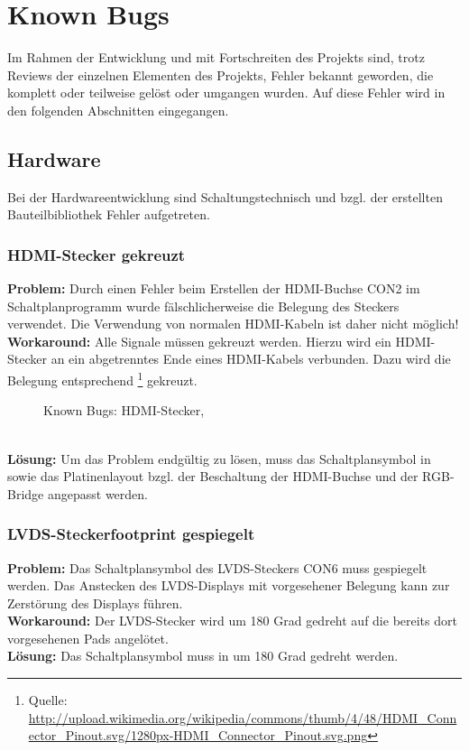 \section{Known Bugs}
Im Rahmen der Entwicklung und mit Fortschreiten des Projekts sind, trotz Reviews der einzelnen Elementen des Projekts, Fehler bekannt geworden, die komplett oder teilweise gelöst oder umgangen wurden. Auf diese Fehler wird in den folgenden Abschnitten eingegangen.
\subsection{Hardware}
Bei der Hardwareentwicklung sind Schaltungstechnisch und bzgl. der erstellten Bauteilbibliothek Fehler aufgetreten. 
\subsubsection{HDMI-Stecker gekreuzt}
\textbf{Problem:} Durch einen Fehler beim Erstellen der HDMI-Buchse CON2 im Schaltplanprogramm  wurde fälschlicherweise die Belegung des Steckers verwendet. Die Verwendung von normalen HDMI-Kabeln ist daher nicht möglich!\\
\textbf{Workaround:} Alle Signale müssen gekreuzt werden. Hierzu wird ein HDMI-Stecker an ein abgetrenntes Ende eines HDMI-Kabels verbunden. Dazu wird die Belegung entsprechend \footnote{Quelle: \url{http://upload.wikimedia.org/wikipedia/commons/thumb/4/48/HDMI_Connector_Pinout.svg/1280px-HDMI_Connector_Pinout.svg.png}} gekreuzt.
\begin{figure}[htp]
	\center
    \caption{Known Bugs: HDMI-Stecker, }
    \label{fig:hdmi_stecker_problem}
\end{figure}\\
\textbf{Lösung:} Um das Problem endgültig zu lösen, muss das Schaltplansymbol in  sowie das Platinenlayout bzgl. der Beschaltung der HDMI-Buchse und der RGB-Bridge angepasst werden.
\subsubsection{LVDS-Steckerfootprint gespiegelt}
\textbf{Problem:} Das Schaltplansymbol des LVDS-Steckers CON6 muss gespiegelt werden. Das Anstecken des LVDS-Displays mit vorgesehener Belegung kann zur Zerstörung des Displays führen.\\
\textbf{Workaround:} Der LVDS-Stecker wird um 180 Grad gedreht auf die bereits dort vorgesehenen Pads angelötet.\\
\textbf{Lösung:} Das Schaltplansymbol muss in  um 180 Grad gedreht werden.
